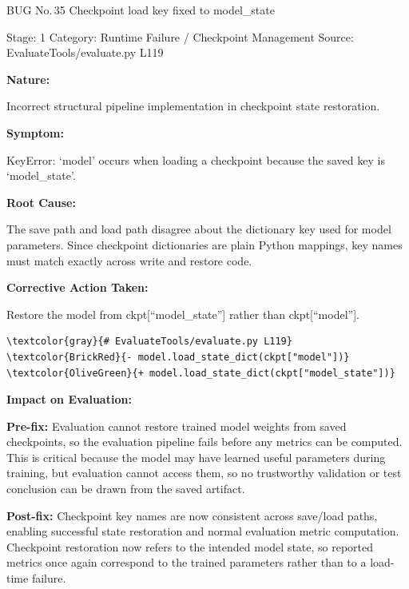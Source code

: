 \documentclass[10pt]{article}
\newcommand{\FieldLabel}[1]{%
 {\bfseries #1:}\par
}
\begin{document}
\begin{bugbox}{BUG No.\,35 \quad Checkpoint load key fixed to model\_state}
{\color{MetaGray}\small Stage: 1 \;\textbar\; Category: Runtime Failure / Checkpoint Management \;\textbar\; Source: EvaluateTools/evaluate.py L119\par}
\vspace{0.22em}
\FieldLabel{Nature}
Incorrect structural pipeline implementation in checkpoint state restoration.
\par
\vspace{0.35em}
\FieldLabel{Symptom}
KeyError: `model' occurs when loading a checkpoint because the saved key is `model\_state'.
\par
\vspace{0.35em}
\FieldLabel{Root Cause}
The save path and load path disagree about the dictionary key used for model parameters. Since checkpoint dictionaries are plain Python mappings, key names must match exactly across write and restore code.
\par
\vspace{0.35em}
\FieldLabel{Corrective Action Taken}
Restore the model from ckpt{[}``model\_state''{]} rather than ckpt{[}``model''{]}.
\par
\vspace{0.35em}
\begin{Verbatim}[commandchars=\\\{\},fontsize=\footnotesize,breaklines=true,breaksymbol={},frame=leftline,framerule=2pt,rulecolor=\color{gray!40},xleftmargin=6pt,formatcom=\singlespacing]
\textcolor{gray}{# EvaluateTools/evaluate.py L119}
\textcolor{BrickRed}{- model.load_state_dict(ckpt["model"])}
\textcolor{OliveGreen}{+ model.load_state_dict(ckpt["model_state"])}
\end{Verbatim}
\vspace{0.22em}
\FieldLabel{Impact on Evaluation}
\textbf{Pre-fix:} Evaluation cannot restore trained model weights from saved checkpoints, so the evaluation pipeline fails before any metrics can be computed. This is critical because the model may have learned useful parameters during training, but evaluation cannot access them, so no trustworthy validation or test conclusion can be drawn from the saved artifact.\par\smallskip
\textbf{Post-fix:} Checkpoint key names are now consistent across save/load paths, enabling successful state restoration and normal evaluation metric computation. Checkpoint restoration now refers to the intended model state, so reported metrics once again correspond to the trained parameters rather than to a load-time failure.
\par
\vspace{0.35em}
\end{bugbox}
\end{document}
